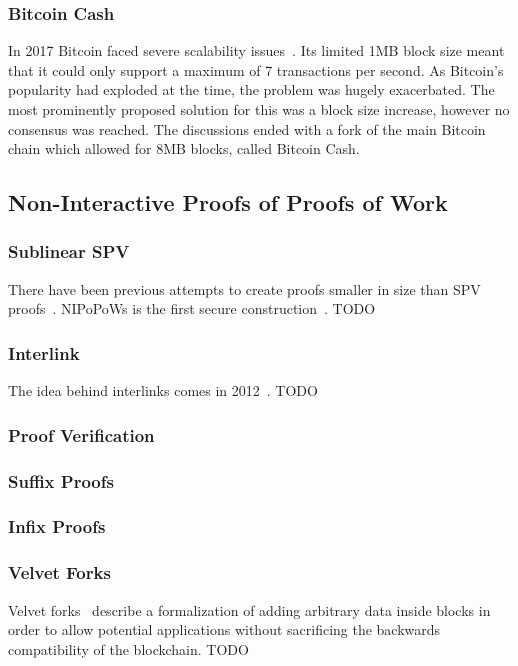 \documentclass[11pt]{llncs}
\begin{document}
\subsubsection{Bitcoin Cash}
In 2017 Bitcoin faced severe scalability issues~\cite{onscaling}. Its limited
1MB block size meant that it could only support a maximum of 7 transactions per
second. As Bitcoin's popularity had exploded at the time, the problem was
hugely exacerbated. The most prominently proposed solution for this was a block
size increase, however no consensus was reached. The discussions ended with a
fork of the main Bitcoin chain which allowed for 8MB blocks, called Bitcoin
Cash.

\subsection{Non-Interactive Proofs of Proofs of Work}

\subsubsection{Sublinear SPV}
There have been previous attempts to create proofs smaller in size than SPV
proofs~\cite{KLS}. NIPoPoWs is the first secure construction~\cite{nipopows}.
TODO

\subsubsection{Interlink}
The idea behind interlinks comes in 2012~\cite{highway}. TODO

\subsubsection{Proof Verification}
\subsubsection{Suffix Proofs}
\subsubsection{Infix Proofs}
\subsubsection{Velvet Forks}
Velvet forks~\cite{nipopows,velvet} describe a formalization of adding
arbitrary data inside blocks in order to allow potential applications without
sacrificing the backwards compatibility of the blockchain. TODO
\end{document}
